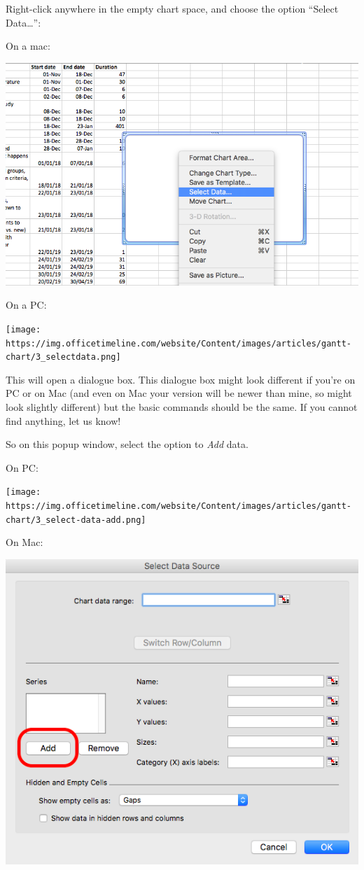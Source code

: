 \documentclass[
]{book}
\begin{document}
Right-click anywhere in the empty chart space, and choose the option ``Select Data\ldots{}'':

On a mac:

\includegraphics{imgs/gantt_select_data.png}

On a PC:

\texttt{[image: https://img.officetimeline.com/website/Content/images/articles/gantt-chart/3\_selectdata.png]}

This will open a dialogue box. This dialogue box might look different if you're on PC or on Mac (and even on Mac your version will be newer than mine, so might look slightly different) but the basic commands should be the same. If you cannot find anything, let us know!

So on this popup window, select the option to \emph{Add} data.

On PC:

\texttt{[image: https://img.officetimeline.com/website/Content/images/articles/gantt-chart/3\_select-data-add.png]}

On Mac:

\includegraphics{imgs/mac_add_data.png}
\end{document}
